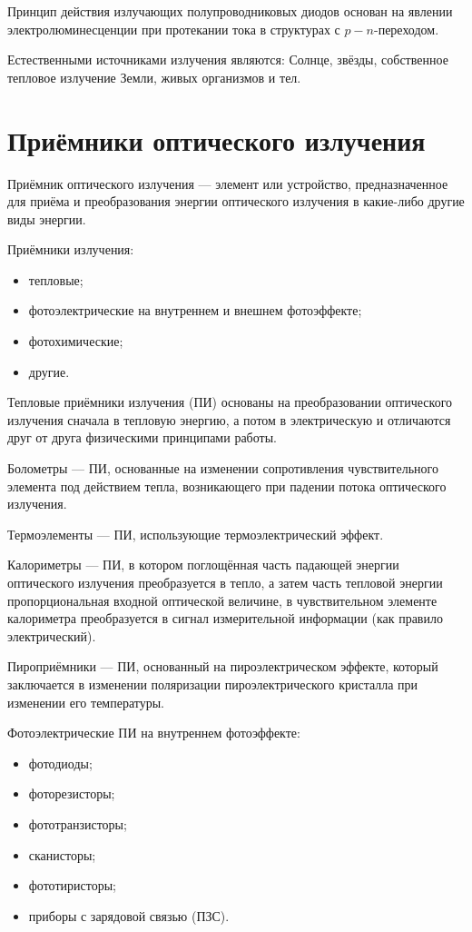 Принцип действия излучающих полупроводниковых диодов основан на явлении электролюминесценции при протекании тока в структурах с $ p-n $-переходом.

Естественными источниками излучения являются: Солнце, звёзды, собственное тепловое излучение Земли, живых организмов и тел.

\section{Приёмники оптического излучения}

Приёмник оптического излучения --- элемент или устройство, предназначенное для приёма и преобразования энергии оптического излучения в какие-либо другие виды энергии.

Приёмники излучения:
\begin{itemize}
	\item тепловые;
	\item фотоэлектрические на внутреннем и внешнем фотоэффекте;
	\item фотохимические;
	\item другие.
\end{itemize}

Тепловые приёмники излучения (ПИ) основаны на преобразовании оптического излучения сначала в тепловую энергию, а потом в электрическую и отличаются друг от друга физическими принципами работы.

Болометры --- ПИ, основанные на изменении сопротивления чувствительного элемента под действием тепла, возникающего при падении потока оптического излучения.

Термоэлементы --- ПИ, использующие термоэлектрический эффект.

Калориметры --- ПИ, в котором поглощённая часть падающей энергии оптического излучения преобразуется в тепло, а затем часть тепловой энергии пропорциональная входной оптической величине, в чувствительном элементе калориметра преобразуется в сигнал измерительной информации (как правило электрический).

Пироприёмники --- ПИ, основанный на пироэлектрическом эффекте, который заключается в изменении поляризации пироэлектрического кристалла при изменении его температуры.

Фотоэлектрические ПИ на внутреннем фотоэффекте:
\begin{itemize}
	\item фотодиоды;
	\item фоторезисторы;
	\item фототранзисторы;
	\item сканисторы;
	\item фототиристоры;
	\item приборы с зарядовой связью (ПЗС).
\end{itemize}

